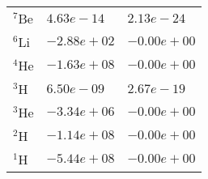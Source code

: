 \begin{tabular}{lll}
 $^{7}$Be  & $4.63e-14 $                                                        & $2.13e-24 $                                                           \\
 $^{6}$Li  & $-2.88e+02 $                                                       & $-0.00e+00 $                                                          \\
 $^{4}$He  & $-1.63e+08 $                                                       & $-0.00e+00 $                                                          \\
 $^{3}$H   & $6.50e-09 $                                                        & $2.67e-19 $                                                           \\
 $^{3}$He  & $-3.34e+06 $                                                       & $-0.00e+00 $                                                          \\
 $^{2}$H   & $-1.14e+08 $                                                       & $-0.00e+00 $                                                          \\
 $^{1}$H   & $-5.44e+08 $                                                       & $-0.00e+00 $                                                          \\
\hline
\end{tabular}
